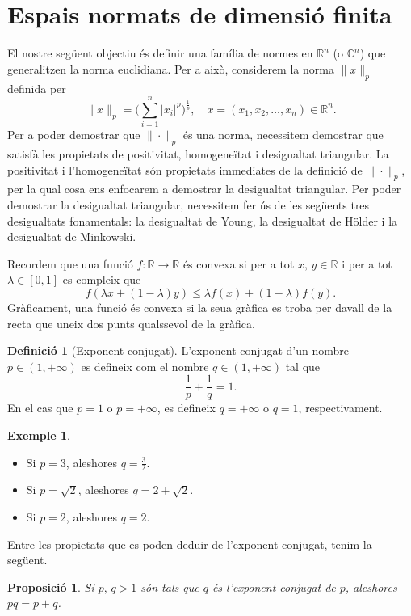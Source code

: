 \documentclass[12pt]{book}
\newtheorem{prop}[teorema]{Proposició}
\theoremstyle{definition}
\newtheorem{defi}[teorema]{Definició}
\theoremstyle{nota}
\theoremstyle{exemple}
\newtheorem{exemple}[teorema]{Exemple}
\begin{document}
\section{Espais normats de dimensió finita}

El nostre següent objectiu és definir una família de normes en
$\mathbb{R}^n$ (o $\mathbb{C}^n$) que generalitzen la norma
euclidiana. Per a això, considerem la norma $\|x\|_p$ definida per
\[
  \|x\|_p = \Big( \sum_{i=1}^{n} |x_i|^p \Big)^{\frac{1}{p}},
  \quad x = (x_1, x_2, \dotsc, x_n) \in \mathbb{R}^n.
\]
Per a poder demostrar que $\|\cdot\|_p$ és una norma, necessitem
demostrar que satisfà les propietats de positivitat, homogeneïtat i
desigualtat triangular. La positivitat i l'homogeneïtat són propietats
immediates de la definició de $\|\cdot\|_p$, per la qual cosa ens
enfocarem a demostrar la desigualtat triangular. Per poder demostrar
la desigualtat triangular, necessitem fer ús de les següents tres
desigualtats fonamentals: la desigualtat de Young, la desigualtat de
Hölder i la desigualtat de Minkowski.

Recordem que una funció $f : \mathbb{R} \to \mathbb{R}$ és convexa si
per a tot $x, \, y \in \mathbb{R}$ i per a tot $\lambda \in [0,1]$ es
compleix que
\[
  f(\lambda x + (1-\lambda) y) \leq \lambda f(x) + (1-\lambda) f(y).
\]
Gràficament, una funció és convexa si la seua gràfica es troba per
davall de la recta que uneix dos punts qualssevol de la gràfica.

\begin{defi}[Exponent conjugat]
  L'exponent conjugat d'un nombre $p \in (1, +\infty)$ es defineix com
  el nombre $q \in (1, +\infty)$ tal que
  \[
    \frac{1}{p} + \frac{1}{q} = 1.
  \]
  En el cas que $p = 1$ o $p = +\infty$, es defineix $q = +\infty$ o
  $q = 1$, respectivament.
\end{defi}

\begin{exemple}
  \begin{itemize}[nosep]
  \item Si $p=3$, aleshores $q = \frac{3}{2}$.
  \item Si $p = \sqrt{2}$, aleshores $q = 2 + \sqrt{2}$.
  \item Si $p = 2$, aleshores $q = 2$.
  \end{itemize}
\end{exemple}

Entre les propietats que es poden deduir de l'exponent conjugat, tenim
la següent.

\begin{prop}
  Si $p,\, q > 1$ són tals que $q$ és l'exponent conjugat de $p$,
  aleshores $pq = p + q$.
\end{prop}
\end{document}
